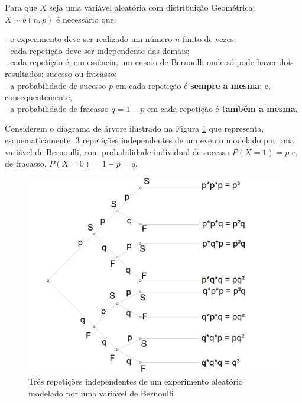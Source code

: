 \documentclass[
]{book}
\begin{document}
\hfill\break

Para que \(X\) seja uma variável aleatória com distribuição Geométrica: \(X\sim b(n,p)\) é necessário que:

\hfill\break
- o experimento deve ser realizado um número \(n\) finito de vezes;\\
- cada repetição deve ser independente das demais;\\
- cada repetição é, em essência, um ensaio de Bernoulli onde só pode haver dois resultados: sucesso ou fracasso;\\
- a probabilidade de sucesso \(p\) em cada repetição é \textbf{sempre a mesma}; e, consequentemente,\\
- a probabilidade de fracasso \(q=1-p\) em cada repetição é \textbf{também a mesma}.

\hfill\break

Considerem o diagrama de árvore ilustrado na Figura \ref{fig:fig14} que representa, esquematicamente, 3 repetições independentes de um evento modelado por uma variável de Bernoulli, com probabilidade individual de sucesso \(P(X=1)=p\) e, de fracasso, \(P(X=0)=1-p=q\).

\hfill\break

\begin{figure}

{\centering \includegraphics[width=0.6\linewidth]{images6/arv_bin} 

}

\caption{Três repetições independentes de um experimento aleatório modelado por uma variável de Bernoulli}\label{fig:fig14}
\end{figure}

\hfill\break

\begin{table}[!htb]
    \caption*{Função discreta de probabilidade da variável $X\sim b(n,p)$ com $n=3$ (repetições)}
\end{table}
\end{document}
